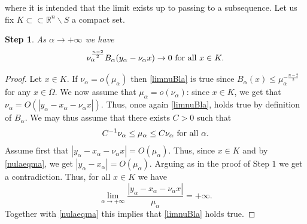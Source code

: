 \documentclass[10pt]{amsart}
\numberwithin{equation}{section}
\newcommand{\Om}{\Omega}
\newcommand{\ma}{\mu_\alpha}
\def \rr {\mathbb{R}}
\def \bb{\hbox}
\def \xl{x_\alpha}
\def \ls{+\infty}
\def\la{\alpha}
\def \ma{\mu_{\alpha}}
\def \yl{y_{\alpha}}
\newtheorem{step}{Step}
\theoremstyle{plain}
\theoremstyle{remark}
\begin{document}
  where it is intended that the limit exists up to passing to a subsequence. Let us fix $K\subset\subset\rr^n \backslash S$ a compact set.
\begin{step} \label{step:limnuBla}
As $\la\to \ls$ we have 
	\begin{equation}\label{limnuBla}
		\nu_\la^{\frac{n-2}{2}}B_{\la}(\yl-\nu_\la x)\to 0 \bb{ for all } x\in K.
	\end{equation}
\end{step}
\begin{proof} Let $x \in K$. If $\nu_{\la}=o(\ma)$ then \eqref{limnuBla} is true since $B_\alpha (x) \le \ma^{- \frac{n-2}{2}}$ for any $x \in \overline{\Om}$. We now assume that $\ma=o(\nu_{\la})$: since $x\in K$, we get that $\nu_{\la}=O\left( |\yl-\xl-\nu_{\la}x|\right)$. Thus, once again \eqref{limnuBla}, holds true by definition of $B_\alpha$. We may thus assume that there exists $C>0$ such that
\begin{equation}\label{nulaeqma}
	C^{-1}\nu_{\la}\leq \ma \leq C\nu_{\la} \bb{ for all } \alpha.
\end{equation}
Assume first that $|\yl-\xl-\nu_{\la}x|=O(\ma)$. Thus, since $x\in K$ and by \eqref{nulaeqma}, we get  $|\yl-\xl|=O(\ma)$. Arguing as in the proof of Step $1$ we get a contradiction. Thus, for all $x\in K$ we have 
\begin{equation*}
	\lim_{\la\to \ls} \frac{|\yl-\xl-\nu_{\la}x|}{\ma}=+\infty.
\end{equation*}
Together with \eqref{nulaeqma} this implies that \eqref{limnuBla} holds true. 
\end{proof}
\end{document}
